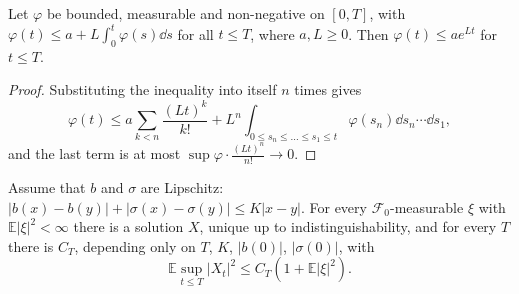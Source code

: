 \begin{lemma}[Gronwall]\label{lem:gronwall}
Let $\varphi$ be bounded, measurable and non-negative on $[0,T]$, with $\varphi(t)\le a+L\int_0^t\varphi(s)\dd s$ for all $t\le T$, where $a,L\ge0$. Then $\varphi(t)\le ae^{Lt}$ for $t\le T$.
\end{lemma}

\begin{proof}
Substituting the inequality into itself $n$ times gives
\[
\varphi(t)\le a\sum_{k<n}\frac{(Lt)^k}{k!}+L^n\int_{0\le s_n\le\dots\le s_1\le t}\varphi(s_n)\dd s_n\cdots\dd s_1 ,
\]
and the last term is at most $\sup\varphi\cdot\frac{(Lt)^n}{n!}\to0$.
\end{proof}

\begin{theorem}[It\^o, 1951]\label{thm:sdeexist}
Assume that $b$ and $\sigma$ are Lipschitz: $|b(x)-b(y)|+|\sigma(x)-\sigma(y)|\le K|x-y|$. For every $\mathcal F_0$-measurable $\xi$ with $\mathbb E|\xi|^2<\infty$ there is a solution $X$, unique up to
indistinguishability, and for every $T$ there is $C_T$, depending only on $T$, $K$, $|b(0)|$, $|\sigma(0)|$, with
\[
\mathbb E\sup_{t\le T}|X_t|^2\le C_T(1+\mathbb E|\xi|^2).
\]
\end{theorem}

